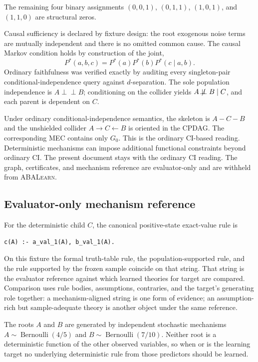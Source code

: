\documentclass[11pt]{article}
\DeclareRobustCommand{\code}[1]{\texttt{\detokenize{#1}}}
\newcommand{\ABALearn}{\textsc{ABALearn}}
\newcommand{\indep}{\perp\!\!\!\perp}
\newcommand{\notindep}{\not\!\perp\!\!\!\perp}
\begin{document}
The remaining four binary assignments
\((0,0,1)\), \((0,1,1)\), \((1,0,1)\), and \((1,1,0)\) are structural zeros.

Causal sufficiency is declared by fixture design: the root exogenous noise
terms are mutually independent and there is no omitted common cause. The
causal Markov condition holds by construction of the joint,
\[
P^\ast(a,b,c)=P^\ast(a)P^\ast(b)P^\ast(c\mid a,b).
\]
Ordinary faithfulness was verified exactly by auditing every singleton-pair
conditional-independence query against \(d\)-separation. The sole population
independence is \(A\indep B\); conditioning on the collider yields
\(A\notindep B\mid C\), and each parent is dependent on \(C\).

Under ordinary conditional-independence semantics, the skeleton is \(A-C-B\)
and the unshielded collider \(A\rightarrow C\leftarrow B\) is oriented in the
CPDAG. The corresponding MEC contains only \(G_0\). This is the ordinary
CI-based reading. Deterministic mechanisms can impose additional functional
constraints beyond ordinary CI. The present document stays with the ordinary
CI reading. The graph, certificates, and mechanism reference are
evaluator-only and are withheld from \ABALearn{}.

\subsection{Evaluator-only mechanism reference}

For the deterministic child \(C\), the canonical positive-state exact-value
rule is

\begin{lstlisting}
c(A) :- a_val_1(A), b_val_1(A).
\end{lstlisting}

On this fixture the formal truth-table rule, the population-supported rule,
and the rule supported by the frozen sample coincide on that string. That
string is the evaluator reference against which learned theories for target
\code{c} are compared. Comparison uses rule bodies, assumptions, contraries,
and the target's generating role together: a mechanism-aligned string is one
form of evidence; an assumption-rich but sample-adequate theory is another
object under the same reference.

The roots \(A\) and \(B\) are generated by independent stochastic mechanisms
\(A\sim\operatorname{Bernoulli}(4/5)\) and \(B\sim\operatorname{Bernoulli}(7/10)\).
Neither root is a deterministic function of the other observed variables, so
when \code{a} or \code{b} is the learning target no underlying deterministic
rule from those predictors should be learned.
\end{document}
